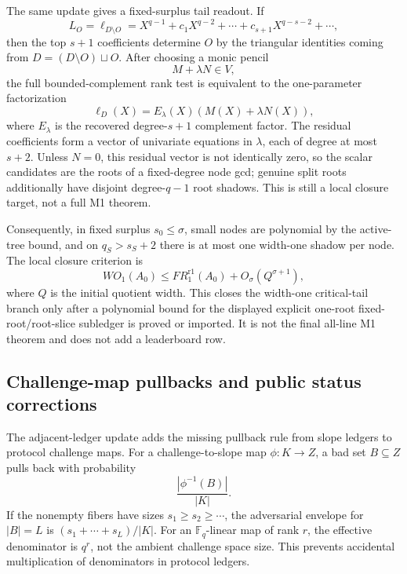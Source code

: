 \documentclass[11pt]{article}
\newcommand{\F}{\mathbb F}
\begin{document}
The same update gives a fixed-surplus tail readout.  If
\[
  L_O=\ell_{D\setminus O}
  =
  X^{q-1}+c_1X^{q-2}+\cdots+c_{s+1}X^{q-s-2}+\cdots ,
\]
then the top \(s+1\) coefficients determine \(O\) by the triangular identities
coming from \(D=(D\setminus O)\sqcup O\).  After choosing a monic pencil
\[
  M+\lambda N\in V,
\]
the full bounded-complement rank test is equivalent to the one-parameter
factorization
\[
  \ell_D(X)=E_\lambda(X)(M(X)+\lambda N(X)),
\]
where \(E_\lambda\) is the recovered degree-\(s+1\) complement factor.  The
residual coefficients form a vector of univariate equations in \(\lambda\),
each of degree at most \(s+2\).  Unless \(N=0\), this residual vector is not
identically zero, so the scalar candidates are the roots of a fixed-degree node
gcd; genuine split roots additionally have disjoint degree-\(q-1\) root shadows.
This is still a local closure target, not a full M1 theorem.

Consequently, in fixed surplus \(s_0\le\sigma\), small nodes are polynomial by
the active-tree bound, and on \(q_S>s_S+2\) there is at most one width-one
shadow per node.  The local closure criterion is
\[
  WO_1(A_0)
  \le FR^{\mathrm{r1}}_1(A_0)+O_\sigma(Q^{\sigma+1}),
\]
where \(Q\) is the initial quotient width.  This closes the width-one
critical-tail branch only after a polynomial bound for the displayed explicit
one-root fixed-root/root-slice subledger is proved or imported.  It is not the
final all-line M1 theorem and does not add a leaderboard row.

\subsection{Challenge-map pullbacks and public status corrections}

The adjacent-ledger update adds the missing pullback rule from slope ledgers to
protocol challenge maps.  For a challenge-to-slope map \(\phi:K\to Z\), a bad
set \(B\subseteq Z\) pulls back with probability
\[
  \frac{|\phi^{-1}(B)|}{|K|}.
\]
If the nonempty fibers have sizes \(s_1\ge s_2\ge\cdots\), the adversarial
envelope for \(|B|=L\) is \((s_1+\cdots+s_L)/|K|\).  For an \(\F_q\)-linear map
of rank \(r\), the effective denominator is \(q^r\), not the ambient challenge
space size.  This prevents accidental multiplication of denominators in protocol
ledgers.
\end{document}
